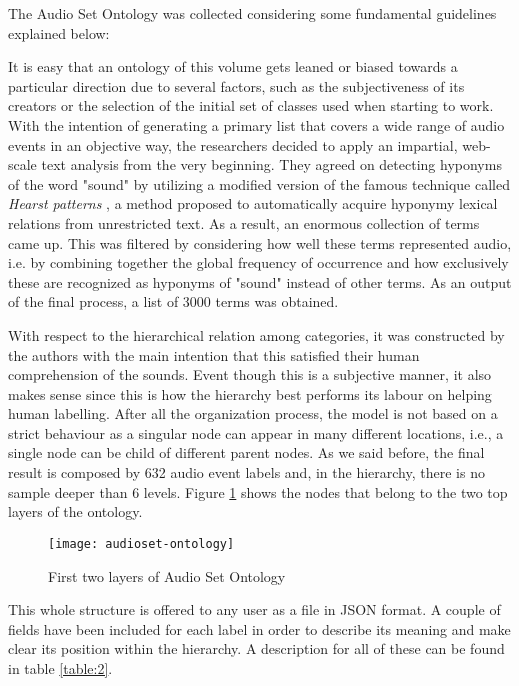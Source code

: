 	The Audio Set Ontology was collected considering some fundamental guidelines explained below:
	
	
	It is easy that an ontology of this volume gets leaned or biased towards a particular direction due to several factors, such as the subjectiveness of its creators or the selection of the initial set of classes used when starting to work. With the intention of generating a primary list that covers a wide range of audio events in an objective way, the researchers decided to apply an impartial, web-scale text analysis from the very beginning. They agreed on detecting hyponyms of the word "sound" by utilizing a modified version of the famous technique called \textit{Hearst patterns} \cite{Hearst1992}, a method proposed to automatically acquire hyponymy lexical relations from unrestricted text. As a result, an enormous collection of terms came up. This was filtered by considering how well these terms represented audio, i.e. by combining together the global frequency of occurrence and how exclusively these are recognized as hyponyms of "sound" instead of other terms. As an output of the final process, a list of 3000 terms was obtained.
	
	With respect to the hierarchical relation among categories, it was constructed by the authors with the main intention that this satisfied their human comprehension of the sounds. Event though this is a subjective manner, it also makes sense since this is how the hierarchy best performs its labour on helping human labelling.
	After all the organization process, the model is not based on a strict behaviour as a singular node can appear in many different locations, i.e., a single node can be child of different parent nodes. As we said before, the final result is composed by 632 audio event labels and, in the hierarchy, there is no sample deeper than 6 levels. Figure \ref{fig:mesh1} shows the nodes that belong to the two top layers of the ontology.
	
	\begin{figure}[h]
		\centering
		\captionsetup{justification=centering}
		\texttt{[image: audioset-ontology]}
		\caption{First two layers of Audio Set Ontology \cite{Gemmeke2017}}
		\label{fig:mesh1}
	\end{figure}
	
	This whole structure is offered to any user as a file in JSON format. A couple of fields have been included for each label in order to describe its meaning and make clear its position within the hierarchy. A description for all of these can be found in table \ref{table:2}. 
	
